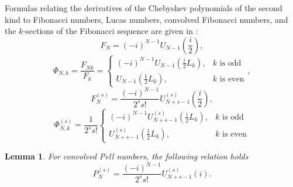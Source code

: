 \documentclass{article}
\newtheorem{lemma}[thm]{Lemma}
\begin{document}
Formulas relating the derivatives of the Chebyshev polynomials of the second kind to Fibonacci numbers, Lucas numbers, convolved Fibonacci numbers, and the $k$-sections of the Fibonacci sequence are given in \cite{ref7,ref8}:
$$
F_N = (-i)^{N - 1}U_{N - 1}\left(\frac{i}{2}\right),
$$
$$
\Phi_{N,k} = \frac{F_{Nk}}{F_k} = \begin{cases}
(-i)^{N - 1}U_{N - 1}\left(\frac{i}{2}L_k\right), & k \mbox{ is odd} \\
U_{N - 1}\left(\frac{1}{2}L_k\right), & k \mbox{ is even}
\end{cases},
$$
\vspace{2mm}
\begin{equation}\label{eq3}
F_N^{(s)} = \frac{(-i)^{N - 1}}{2^s s!}U_{N + s - 1}^{(s)}\left(\frac{i}{2}\right),
\end{equation}
\vspace{2mm}
\begin{equation}\label{eq4}
\Phi_{N,k}^{(s)} = \frac{1}{2^s s!}\begin{cases}
(-i)^{N - 1}U_{N + s - 1}^{(s)}\left(\frac{i}{2}L_k\right), & k \mbox{ is odd} \\
U_{N + s - 1}^{(s)}\left(\frac{1}{2}L_k\right), & k \mbox{ is even}
\end{cases}
\end{equation}
\vspace{2mm}
\begin{lemma}\label{lem1}
For convolved Pell numbers, the following relation holds
\begin{equation}\label{eq5}
P_N^{(s)} = \frac{(-i)^{N - 1}}{2^s s!}U_{N + s - 1}^{(s)}(i).
\end{equation}
\end{lemma}
\end{document}
